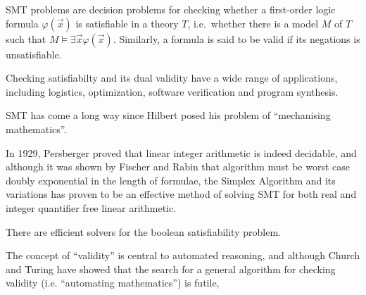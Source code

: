 \documentclass[]{article}
\renewcommand \phi {\varphi}
\begin{document}
SMT problems are decision problems for checking whether a first-order
logic formula \(\phi(\vec x)\) is satisfiable in a theory \(T\),
i.e.~whether there is a model \(M\) of \(T\) such that
\(M \models \exists \vec x \phi(\vec x)\). Similarly, a formula is said
to be valid if its negations is unsatisfiable.

Checking satisfiabilty and its dual validity have a wide range of
applications, including logistics, optimization, software verification
and program synthesis.

SMT has come a long way since Hilbert posed his problem of ``mechanising
mathematics''.

In 1929, Persberger proved that linear integer arithmetic is indeed
decidable, and although it was shown by Fischer and Rabin that algorithm
must be worst case doubly exponential in the length of formulae, the
Simplex Algorithm and its variations has proven to be an effective
method of solving SMT for both real and integer quantifier free linear
arithmetic.

There are efficient solvers for the boolean satisfiability problem.

The concept of ``validity'' is central to automated reasoning, and
although Church and Turing have showed that the search for a general
algorithm for checking validity (i.e. ``automating mathematics'') is
futile,
\end{document}
